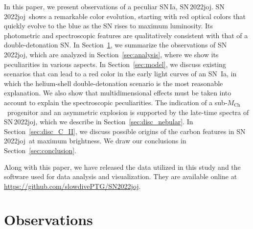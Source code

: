 \documentclass[twocolumn]{aastex631}
\newcommand{\sn}{SN\,2022joj}
\newcommand{\Mch}{$M_\mathrm{Ch}$}
\begin{document}
\begin{CJK*}{UTF8}{gbsn}
In this paper, we present observations of a peculiar SN\,Ia, \sn. \sn\ shows a remarkable color evolution, starting with red optical colors that quickly evolve to the blue as the SN rises to maximum luminosity. Its photometric and spectroscopic features are qualitatively consistent with that of a double-detonation SN. In Section~\ref{sec:obs}, we summarize the observations of \sn, which are analyzed in Section~\ref{sec:analysis}, where we show its peculiarities in various aspects. In Section~\ref{sec:model}, we discuss existing scenarios that can lead to a red color in the early light curves of an SN \,Ia, in which the helium-shell double-detonation scenario is the most reasonable explanation. We also show that multidimensional effects must be taken into account to explain the spectroscopic peculiarities. 
The indication of a sub-\Mch\ progenitor and an asymmetric explosion is supported by the late-time spectra of \sn, which we describe in Section~\ref{sec:disc_nebular}. In Section~\ref{sec:disc_C_II}, we discuss possible origins of the carbon features in \sn\ at maximum brightness.
We draw our conclusions in Section~\ref{sec:conclusion}.

Along with this paper, we have released the data utilized in this study and the software used for data analysis and visualization. They are available online at \url{https://github.com/slowdivePTG/SN2022joj}.

\section{Observations} \label{sec:obs}

\end{CJK*}
\end{document}
